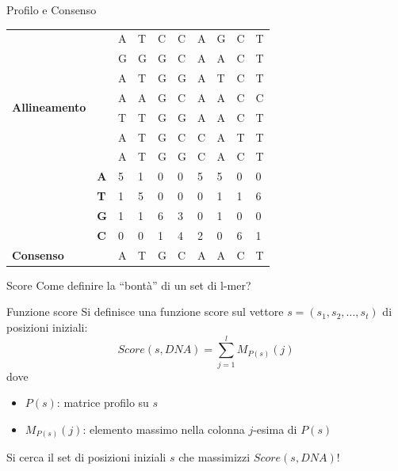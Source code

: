	\begin{frame}{Profilo e Consenso}
		\begin{center}
			\begin{tabular}{l l l l l l l l l l}
				\multirow{8}{*}{\textbf{Allineamento}} & & A & T & C & C & A & G & C & T\\
				& & G & G & G & C & A & A & C & T\\
				& & A & T & G & G & A & T & C & T\\
				& & A & A & G & C & A & A & C & C\\
				& & T & T & G & G & A & A & C & T\\
				& & A & T & G & C & C & A & T & T\\
				& & A & T & G & G & C & A & C & T\\
				\hline
				\multirow{4}{*}{\textbf{Profilo}} & \textbf{A} & 5 & 1 & 0 & 0 & 5 & 5 & 0 & 0\\
				& \textbf{T} & 1 & 5 & 0 & 0 & 0 & 1 & 1 & 6\\
				& \textbf{G} & 1 & 1 & 6 & 3 & 0 & 1 & 0 & 0\\
				& \textbf{C} & 0 & 0 & 1 & 4 & 2 & 0 & 6 & 1\\
				\hline
				\textbf{Consenso} & & A & T & G & C & A & A & C & T 
			\end{tabular}
		\end{center}
	\end{frame}
	
	\begin{frame}{Score}
		Come definire la ``bontà'' di un set di l-mer?
		\begin{block}{Funzione score}
			Si definisce una funzione score sul vettore $s=(s_1,s_2,\dots,s_t)$ di posizioni iniziali:
			\begin{equation*}
				Score(s,DNA)=\sum_{j=1}^{l}M_{P(s)}(j)
			\end{equation*}
			dove
			\begin{itemize}
				\item $P(s)$: matrice profilo su $s$
				\item $M_{P(s)}(j)$: elemento massimo nella colonna $j$-esima di $P(s)$
			\end{itemize}
		\end{block}
		Si cerca il set di posizioni iniziali $s$ che massimizzi $Score(s,DNA)$!
	\end{frame}
	
